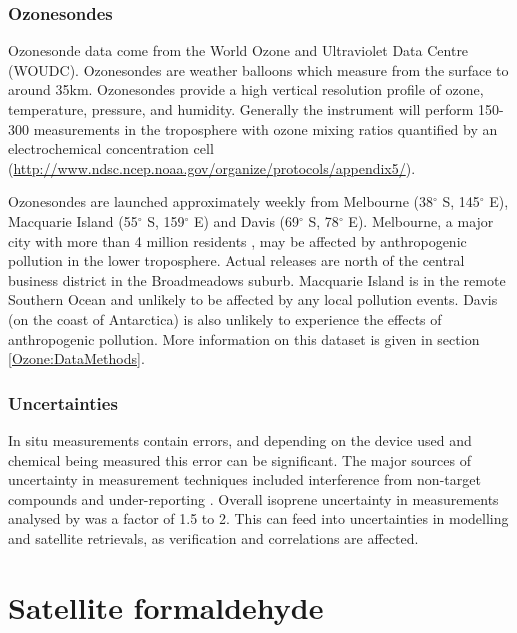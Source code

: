     
    
    \subsubsection{Ozonesondes}
    \label{Model:Datasets:ozonesondes}
    
      Ozonesonde data come from the World Ozone and Ultraviolet Data Centre (WOUDC).
      Ozonesondes are weather balloons which measure from the surface to around 35km.
      Ozonesondes provide a high vertical resolution profile of ozone, temperature, pressure, and humidity.
      Generally the instrument will perform 150-300 measurements in the troposphere with ozone mixing ratios quantified by an electrochemical concentration cell (\url{http://www.ndsc.ncep.noaa.gov/organize/protocols/appendix5/}).
      
      Ozonesondes are launched approximately weekly from Melbourne (38$^{\circ}$ S, 145$^{\circ}$ E), Macquarie Island (55$^{\circ}$ S, 159$^{\circ}$ E) and Davis (69$^{\circ}$ S, 78$^{\circ}$ E). 
      Melbourne, a major city with more than 4 million residents \parencite{ABS2016}, may be affected by anthropogenic pollution in the lower troposphere.
      Actual releases are north of the central business district in the Broadmeadows suburb.
      Macquarie Island is in the remote Southern Ocean and unlikely to be affected by any local pollution events.
      Davis (on the coast of Antarctica) is also unlikely to experience the effects of anthropogenic pollution.
      More information on this dataset is given in section \ref{Ozone:DataMethods}.
    
    
    \subsubsection{Uncertainties}
    \label{Model:Datasets:uncertainties}
      
      In situ measurements contain errors, and depending on the device used and chemical being measured this error can be significant.
      The major sources of uncertainty in measurement techniques included interference from non-target compounds and under-reporting \parencite[e.g.,][]{Dunne2018,Guerette2018}.
      Overall isoprene uncertainty in measurements analysed by \textcite{Dunne2018} was a factor of 1.5 to 2.
      This can feed into uncertainties in modelling and satellite retrievals, as verification and correlations are affected.

\section{Satellite formaldehyde}
\label{Model:omhcho}
  
